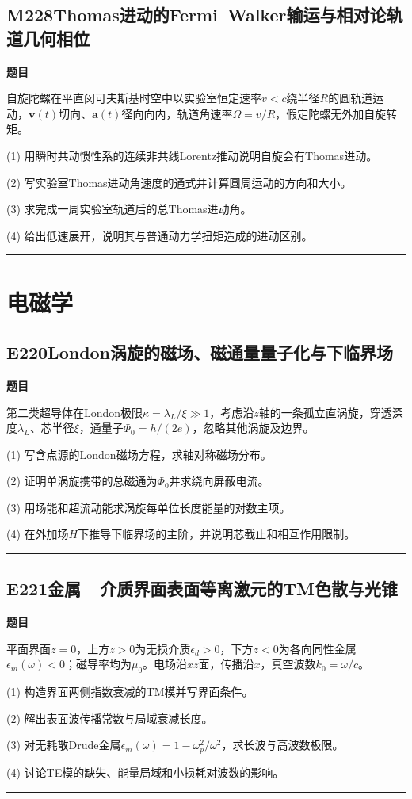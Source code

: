 \documentclass[UTF8,a4paper,11pt,oneside,openany]{ctexbook}
\begin{document}
\section*{M228\quad Thomas进动的Fermi–Walker输运与相对论轨道几何相位}
\textbf{题目}\par
自旋陀螺在平直闵可夫斯基时空中以实验室恒定速率$v<c$绕半径$R$的圆轨道运动，$\boldsymbol v(t)$切向、$\boldsymbol a(t)$径向向内，轨道角速率$\Omega=v/R$，假定陀螺无外加自旋转矩。
\par\smallskip\noindent (1) 用瞬时共动惯性系的连续非共线Lorentz推动说明自旋会有Thomas进动。
\par\smallskip\noindent (2) 写实验室Thomas进动角速度的通式并计算圆周运动的方向和大小。
\par\smallskip\noindent (3) 求完成一周实验室轨道后的总Thomas进动角。
\par\smallskip\noindent (4) 给出低速展开，说明其与普通动力学扭矩造成的进动区别。
\par\medskip\hrule\medskip
\chapter{电磁学}
\section*{E220\quad London涡旋的磁场、磁通量量子化与下临界场}
\textbf{题目}\par
第二类超导体在London极限$\kappa=\lambda_L/\xi\gg1$，考虑沿$z$轴的一条孤立直涡旋，穿透深度$\lambda_L$、芯半径$\xi$，通量子$\Phi_0=h/(2e)$，忽略其他涡旋及边界。
\par\smallskip\noindent (1) 写含点源的London磁场方程，求轴对称磁场分布。
\par\smallskip\noindent (2) 证明单涡旋携带的总磁通为$\Phi_0$并求绕向屏蔽电流。
\par\smallskip\noindent (3) 用场能和超流动能求涡旋每单位长度能量的对数主项。
\par\smallskip\noindent (4) 在外加场$H$下推导下临界场的主阶，并说明芯截止和相互作用限制。
\par\medskip\hrule\medskip
\section*{E221\quad 金属—介质界面表面等离激元的TM色散与光锥}
\textbf{题目}\par
平面界面$z=0$，上方$z>0$为无损介质$\epsilon_d>0$，下方$z<0$为各向同性金属$\epsilon_m(\omega)<0$；磁导率均为$\mu_0$。电场沿$xz$面，传播沿$x$，真空波数$k_0=\omega/c$。
\par\smallskip\noindent (1) 构造界面两侧指数衰减的TM模并写界面条件。
\par\smallskip\noindent (2) 解出表面波传播常数与局域衰减长度。
\par\smallskip\noindent (3) 对无耗散Drude金属$\epsilon_m(\omega)=1-\omega_p^2/\omega^2$，求长波与高波数极限。
\par\smallskip\noindent (4) 讨论TE模的缺失、能量局域和小损耗对波数的影响。
\par\medskip\hrule\medskip
\end{document}
